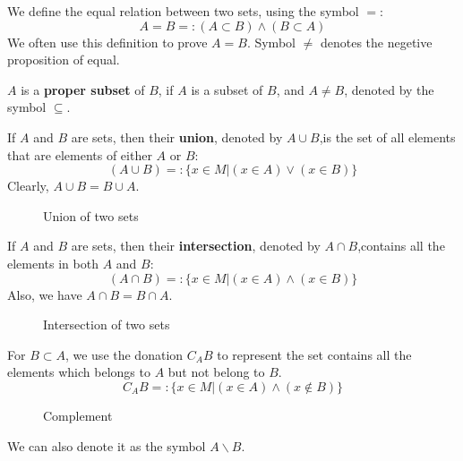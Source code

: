 We define the equal relation between two sets, using the symbol $=$:
\[A=B =:(A\subset B)\wedge(B\subset A)\]
We often use this definition to prove $A=B$.
Symbol $\neq$ denotes the negetive proposition of equal.

$A$ is a \textbf{proper subset} of $B$, if $A$ is a subset of $B$, and $A\neq B$, denoted by the symbol $\subseteq $.

If $A$ and $B$ are sets, then their \textbf{union}, denoted by $A \cup  B$,is the set of all elements that are elements of either $A$ or $B$:
\[(A\cup B)=:\{x\in M|(x\in A)\vee (x\in B)\}\]
Clearly, $A\cup B=B\cup A$.
\begin{figure}
    \centering
    \caption{Union of two sets}
    
\end{figure}

If $A$ and $B$ are sets, then their \textbf{intersection}, denoted by $A \cap  B$,contains all the elements in both $A$ and $B$:
\[(A\cap B)=:\{x\in M|(x\in A)\wedge (x\in B)\}\]
Also, we have $A\cap B=B\cap A$.
\begin{figure}[h] 
    \centering
    \caption{Intersection of two sets}
    
\end{figure}

For $B\subset A$, we use the donation $C_{A}B$ to represent the set contains all the elements which belongs to $A$ but not belong to $B$.
\[C_{A}B=:\{x\in M|(x\in A)\wedge(x\not\in B)\}\]
\begin{figure}[h]
    \centering
    \caption{Complement}
    
\end{figure}

We can also denote it as the symbol $A\backslash B$.